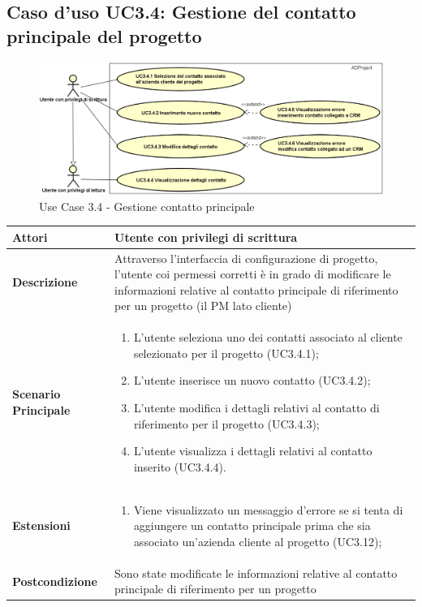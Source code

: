 	\hypertarget{UC3.4}{}
	\subsection{Caso d'uso UC3.4: Gestione del contatto principale del progetto}
		\begin{figure}[H]
		\centering
		\includegraphics[scale=0.5]{images/useCase/UC3_4}
		\caption{Use Case 3.4 - Gestione contatto principale}
		\label{fig:uc3.4}
	\end{figure}
	\begin{longtable}{ | p{2.7cm} | p{12cm} |}
		\hline \textbf{Attori} & Utente con privilegi di scrittura\\ 
		\hline \textbf{Descrizione} & Attraverso l’interfaccia di configurazione di progetto, l’utente coi permessi corretti è in grado di modificare le informazioni relative al contatto principale di riferimento per un progetto (il PM lato cliente)\\ 
		\hline \textbf{Scenario Principale} & \begin{enumerate}
			\itemsep-0.5em 
			\item L’utente seleziona uno dei contatti associato al cliente selezionato per il progetto  (UC3.4.1);
			\item L’utente inserisce un nuovo contatto  (UC3.4.2);
			\item L’utente modifica i dettagli relativi al contatto di riferimento per il progetto  (UC3.4.3);
			\item L’utente visualizza i dettagli relativi al contatto inserito  (UC3.4.4).
			
		\end{enumerate}
		\\ 
		\hline \textbf{Estensioni} & \begin{enumerate}
			\item Viene visualizzato un messaggio d'errore se si tenta di aggiungere un contatto principale prima che sia associato un'azienda cliente al progetto (UC3.12);
			
		\end{enumerate}
		\\ 
		\hline \textbf{Postcondizione} & Sono state modificate le informazioni relative al contatto principale di riferimento per un progetto \\ 
		\hline 
	\end{longtable}
	
